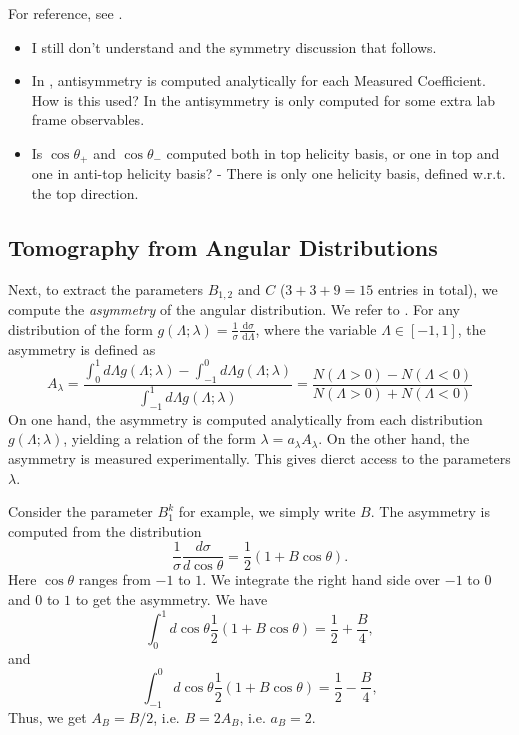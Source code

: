 For reference, see \autocite[Sect.~2]{cmsMeasurementTop2019}. 

\begin{tcolorbox}[breakable,colback=red!10, title=Remaining Questions]
\begin{itemize}
    \item I still don't understand \autocite[eqn.~3]{cmsMeasurementTop2019} and the symmetry discussion that follows. 
    \item In \autocite[Sect.~3]{quirosProtonProtonCollisions2024}, antisymmetry is computed analytically for each Measured Coefficient. How is this used? In \autocite[eqn.~11]{cmsMeasurementTop2019} the antisymmetry is only computed for some extra lab frame observables.
    \item Is $\cos \theta_+$ and $\cos \theta_-$ computed both in top helicity basis, or one in top and one in anti-top helicity basis? {\color{purple!5} - There is only one helicity basis, defined w.r.t. the top direction.}
\end{itemize} 
\end{tcolorbox}

\subsection{Tomography from Angular Distributions}
    
Next, to extract the parameters $B_{1, 2}$ and $C$ ($3 + 3 + 9 = 15$ entries in total), we compute the \textit{asymmetry} of the angular distribution. We refer to \autocite[eqn.~(2.21)]{quirosProtonProtonCollisions2024}. For any distribution of the form $g(\Lambda ; \lambda)=\frac{1}{\sigma} \frac{\mathrm{~d} \sigma}{\mathrm{~d} \Lambda}$, where the variable $\Lambda \in[-1,1]$, the asymmetry is defined as
\[
A_\lambda=\frac{\int_0^1 d \Lambda g(\Lambda ; \lambda)-\int_{-1}^0 d \Lambda g(\Lambda ; \lambda)}{\int_{-1}^1 d \Lambda g(\Lambda ; \lambda)}=\frac{N(\Lambda>0)-N(\Lambda<0)}{N(\Lambda>0)+N(\Lambda<0)}
\]
On one hand, the asymmetry is computed analytically from each distribution $g(\Lambda ; \lambda)$, yielding a relation of the form $\lambda=a_\lambda A_\lambda$. On the other hand, the asymmetry is measured experimentally. This gives dierct access to the parameters $\lambda$.

\begin{example}
    Consider the parameter $B_1^k$ for example, we simply write $B$. The asymmetry is computed from the distribution
    \[
        \frac{1}{\sigma} \frac{d \sigma}{d \cos \theta} = \frac{1}{2} (1 + B \cos \theta).
    \]
    Here $\cos \theta$ ranges from $-1$ to $1$. We integrate the right hand side over $-1$ to $0$ and $0$ to $1$ to get the asymmetry. We have
    \[
        \int_0^1 d \cos \theta \frac{1}{2} (1 + B \cos \theta)  = \frac{1}{2} + \frac{B}{4},
    \]
    and
    \[
        \int_{-1}^0 d \cos \theta \frac{1}{2} (1 + B \cos \theta)  = \frac{1}{2} - \frac{B}{4},
    \]
    Thus, we get $A_B = B/2$, i.e. $B = 2 A_B$, i.e. $a_B = 2$.
\end{example}

